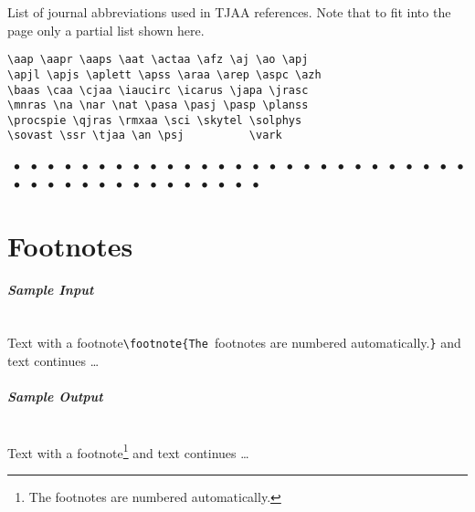 \documentclass[usenatbib]{tjaa}
\begin{document}
List of journal abbreviations used in TJAA references. Note that to fit into
the page only a partial list shown here.
\begin{verbatim}
\aap \aapr \aaps \aat \actaa \afz \aj \ao \apj
\apjl \apjs \aplett \apss \araa \arep \aspc \azh
\baas \caa \cjaa \iaucirc \icarus \japa \jrasc
\mnras \na \nar \nat \pasa \pasj \pasp \planss
\procspie \qjras \rmxaa \sci \skytel \solphys
\sovast \ssr \tjaa \an \psj          \vark
\end{verbatim}
\begin{footnotesize}
\aap		~$\bullet$
\aapr		~$\bullet$
\aaps		~$\bullet$
\aat		~$\bullet$
\actaa		~$\bullet$
\afz		~$\bullet$
\aj		~$\bullet$
\ao 		~$\bullet$
\apj		~$\bullet$
\apjl		~$\bullet$
\apjs		~$\bullet$
\aplett		~$\bullet$
\apss		~$\bullet$
\araa		~$\bullet$
\arep		~$\bullet$
\aspc		~$\bullet$
\azh		~$\bullet$
\baas		~$\bullet$
\caa		~$\bullet$
\cjaa		~$\bullet$
\iaucirc	~$\bullet$
\icarus		~$\bullet$
\japa		~$\bullet$
\jrasc		~$\bullet$
\mnras		~$\bullet$
\na		~$\bullet$
\nar		~$\bullet$
\nat		~$\bullet$
\pasa		~$\bullet$
\pasj		~$\bullet$
\pasp		~$\bullet$
\planss		~$\bullet$
\procspie	~$\bullet$
\qjras		~$\bullet$
\rmxaa		~$\bullet$
\sci		~$\bullet$
\skytel		~$\bullet$
\solphys	~$\bullet$
\sovast		~$\bullet$
\ssr		~$\bullet$
\an		~$\bullet$
\psj		~$\bullet$
\tjaa\\\vark
\end{footnotesize}

\section{Footnotes}

\paragraph*{\itshape Sample Input}~\\
Text with a footnote\verb|\footnote{The |{footnotes are numbered automatically.}\verb|}| and text continues \dots

\paragraph*{\itshape Sample Output}~\\
Text with a footnote\footnote{The footnotes are numbered automatically.}
and text continues \dots

\end{document}
